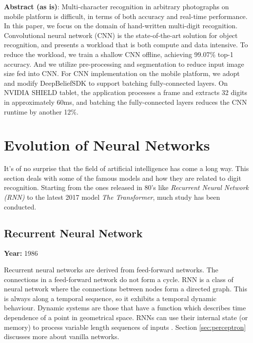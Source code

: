 \documentclass[12pt, a4paper]{report}
\begin{document}
\textbf{Abstract (as is)}: Multi-character recognition in arbitrary photographs on mobile platform is difficult, in terms of both accuracy and real-time performance. In this paper, we focus on the domain of hand-written multi-digit recognition. Convolutional neural network (CNN) is the state-of-the-art solution for object recognition, and presents a workload that is both compute and data intensive. To reduce the workload, we train a shallow CNN offline, achieving 99.07\% top-1 accuracy. And we utilize pre-processing and segmentation to reduce input image size fed into CNN. For CNN implementation on the mobile platform, we adopt and modify DeepBeliefSDK to support batching fully-connected layers. On NVIDIA SHIELD tablet, the application processes a frame and extracts 32 digits in approximately 60ms, and batching the fully-connected layers reduces the CNN runtime by another 12\%.

\vspace*{\fill}

\chapter{Evolution of Neural Networks}
\label{chap:evolution}
\thispagestyle{fancy}

\hspace{0.5cm} It's of no surprise that the field of artificial intelligence has come a long way. This section deals with some of the famous models and how they are related to digit recognition. Starting from the ones released in 80's like \emph{Recurrent Neural Network (RNN)} to the latest 2017 model \emph{The Transformer}, much study has been conducted.

\section{Recurrent Neural Network}
\label{sec:RNN}

\textbf{Year:} 1986

Recurrent neural networks are derived from feed-forward networks. The connections in a feed-forward network do not form a cycle. RNN is a class of neural network where the connections between nodes form a directed graph. This is always along a temporal sequence, so it exhibits a temporal dynamic behaviour. Dynamic systems are those that have a function which describes time dependence of a point in geometrical space. RNNs can use their internal state (or memory) to process variable length sequences of inputs \cite{wiki:rnns}. Section \eqref{sec:perceptron} discusses more about vanilla networks.
\end{document}
